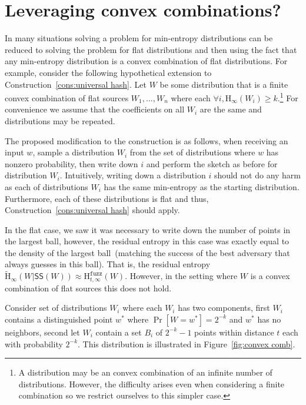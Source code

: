 \documentclass[11pt]{article}
\newcommand{\consref}[1]{\mbox{Construction~\ref{#1}}}
\newcommand{\figref}[1]{\mbox{Figure~\ref{#1}}}
\newcommand{\class}[1]{{\ensuremath{\mathsf{#1}}}}
\newcommand{\sketch}{\ensuremath{\class{SS}}\xspace}
\newcommand{\Hoo}{\mathrm{H}_\infty}
\newcommand{\Hav}{\tilde{\mathrm{H}}_\infty}
\newcommand{\Hfuzz}{\mathrm{H}^{\mathtt{fuzz}}_{t,\infty}}
\begin{document}



\appendix

\section{Leveraging convex combinations?}
\label{sec:convex comb}
In many situations solving a problem for min-entropy distributions can be reduced to solving the problem for flat distributions and then using the fact that any min-entropy distribution is a convex combination of flat distributions.  For example, consider the following hypothetical extension to \consref{cons:universal hash}.  Let $W$ be some distribution that is a finite convex combination of flat sources $W_1,..., W_n$ where each $\forall i, \Hoo(W_i)\ge k$.\footnote{A distribution may be an  convex combination of an infinite number of distributions.  However, the difficulty arises even when considering a finite combination so we restrict ourselves to this simpler case.}  For convenience we assume that the coefficients on all $W_i$ are the same and distributions may be repeated. 

The proposed modification to the construction is as follows, when receiving an input $w$, sample a distribution $W_i$ from the set of distributions where $w$ has nonzero probability, then write down $i$ and perform the sketch as before for distribution $W_i$.  Intuitively, writing down a distribution $i$ should not do any harm as each of distributions $W_i$ has the same min-entropy as the starting distribution.  Furthermore, each of these distributions is flat and thus, \consref{cons:universal hash} should apply.

In the flat case, we saw it was necessary to write down the number of points in the largest ball, however, the residual entropy in this case was exactly equal to the density of the largest ball~(matching the success of the best adversary that always guesses in this ball).  That is, the residual entropy $\Hav(W|\sketch(W)) \approx \Hfuzz(W)$.  However, in the setting where $W$ is a convex combination of flat sources this does not hold.

Consider set of distributions $W_i$ where each $W_i$ has two components, first $W_i$ contains a distinguished point $w^*$ where $\Pr[W=w^*] = 2^{-k}$ and $w^*$ has no neighbors, second let $W_i$ contain a set $B_i$ of $2^{-k}-1$ points within distance $t$ each with probability $2^{-k}$.  This distribution is illustrated in \figref{fig:convex comb}.  
\end{document}
